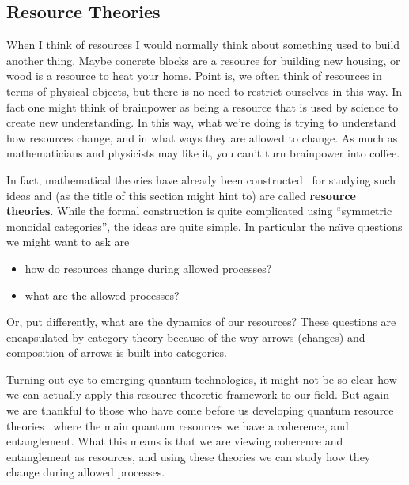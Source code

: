 \documentclass[11pt,english]{article}
\theoremstyle{definition}
\begin{document}
\subsection{Resource Theories}
When I think of resources I would normally think about something used to build another thing. Maybe concrete blocks are a resource for building new housing, or wood is a resource to heat your home. Point is, we often think of resources in terms of physical objects, but there is no need to restrict ourselves in this way. In fact one might think of brainpower as being a resource that is used by science to create new understanding. In this way, what we're doing is trying to understand how resources change, and in what ways they are allowed to change. As much as mathematicians and physicists may like it, you can't turn brainpower into coffee.

In fact, mathematical theories have already been constructed~\cite{mathematical-resources,resource-theory} for studying such ideas and (as the title of this section might hint to) are called \textbf{resource theories}. While the formal construction is quite complicated using ``symmetric monoidal categories'', the ideas are quite simple. In particular the na\"\i ve questions we might want to ask are
\begin{itemize}
	\item how do resources change during allowed processes?
	\item what are the allowed processes?
\end{itemize}
Or, put differently, what are the dynamics of our resources? These questions are encapsulated by category theory because of the way arrows (changes) and composition of arrows is built into categories.

Turning out eye to emerging quantum technologies, it might not be so clear how we can actually apply this resource theoretic framework to our field. But again we are thankful to those who have come before us developing quantum resource theories~\cite{quantum-resources} where the main quantum resources we have a coherence, and entanglement. What this means is that we are viewing coherence and entanglement as resources, and using these theories we can study how they change during allowed processes.
\end{document}
